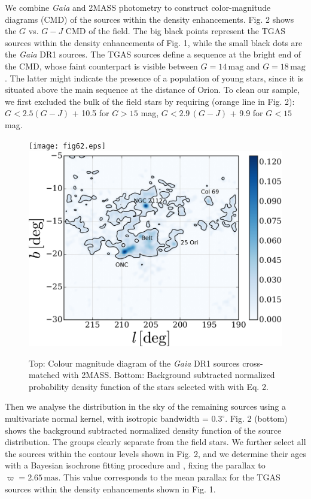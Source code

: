 \documentclass{mem}
\begin{document}
We combine \textit{Gaia} and 2MASS photometry to construct color-magnitude diagrams (CMD) of the sources within the density enhancements. Fig. 2 shows the $G$ vs. $G-J$ CMD of the field. The big black points represent the TGAS sources within the density enhancements of Fig. 1, while the small black dots are the \textit{Gaia} DR1 sources. The TGAS sources define a sequence at the bright end of the CMD, whose faint counterpart is visible between $G = 14 \, \mathrm{mag}$ and $G = 18 \, \mathrm{mag}$. The latter might indicate the presence of a population of young stars, since it is situated above the main sequence at the distance of Orion. To clean our sample, we first
excluded the bulk of the field stars by requiring (orange line in Fig. 2):
$G < 2.5(G-J)$ + 10.5 for  $G > 15$ mag,
$G < 2.9\,(G-J)$ + 9.9 for $G < 15$ mag.
\noindent
\begin{figure}
\texttt{[image: fig62.eps]} \\
\includegraphics[width = \hsize]{fig4.eps}
\caption{Top: Colour magnitude diagram of the \textit{Gaia} DR1 sources cross-matched with 2MASS.  Bottom: Background subtracted normalized probability density function of the stars selected with with Eq. 2.}
\label{fig3}
\end{figure}
Then we analyse the distribution in the sky of the remaining sources using  a multivariate normal kernel, with isotropic  bandwidth = $0.3^{\circ}$.
Fig. 2 (bottom) shows the background subtracted normalized density function of the source distribution. The groups clearly separate from the field stars. We further select all the sources within the contour levels shown in Fig. 2, and we determine their ages with a Bayesian isochrone fitting procedure  \citep[]{JL05} and  \citep[]{Valls-Gabaud2014}, fixing the parallax to $\varpi = 2.65 \, \mathrm{mas}$. This value corresponds to the mean parallax for the TGAS sources within the density enhancements shown in Fig. 1.
\end{document}
